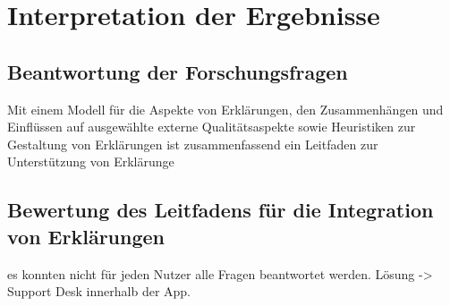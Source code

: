 \section{Interpretation der Ergebnisse}

\subsection*{Beantwortung der Forschungsfragen}

Mit einem Modell für die Aspekte von Erklärungen, den Zusammenhängen und Einflüssen auf ausgewählte externe Qualitätsaspekte sowie Heuristiken zur Gestaltung von Erklärungen ist zusammenfassend ein Leitfaden zur Unterstützung von Erklärunge

\subsection*{Bewertung des Leitfadens für die Integration von Erklärungen}

es konnten nicht für jeden Nutzer alle Fragen beantwortet werden. Lösung -> Support Desk innerhalb der App.